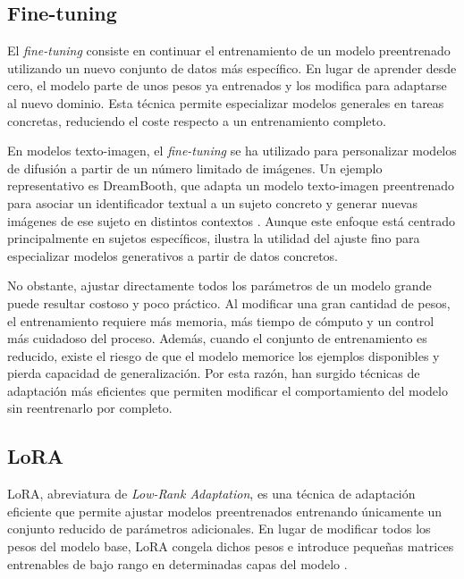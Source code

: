 \documentclass[a4paper,11pt,titlepage]{scrbook}
\begin{document}
\subsection{Fine-tuning}

El \textit{fine-tuning} consiste en continuar el entrenamiento de un modelo preentrenado utilizando un nuevo conjunto de datos más específico. En lugar de aprender desde cero, el modelo parte de unos pesos ya entrenados y los modifica para adaptarse al nuevo dominio. Esta técnica permite especializar modelos generales en tareas concretas, reduciendo el coste respecto a un entrenamiento completo.

\medskip

En modelos texto-imagen, el \textit{fine-tuning} se ha utilizado para personalizar modelos de difusión a partir de un número limitado de imágenes. Un ejemplo representativo es DreamBooth, que adapta un modelo texto-imagen preentrenado para asociar un identificador textual a un sujeto concreto y generar nuevas imágenes de ese sujeto en distintos contextos \cite{ruiz2023dreambooth}. Aunque este enfoque está centrado principalmente en sujetos específicos, ilustra la utilidad del ajuste fino para especializar modelos generativos a partir de datos concretos.

\medskip

No obstante, ajustar directamente todos los parámetros de un modelo grande puede resultar costoso y poco práctico. Al modificar una gran cantidad de pesos, el entrenamiento requiere más memoria, más tiempo de cómputo y un control más cuidadoso del proceso. Además, cuando el conjunto de entrenamiento es reducido, existe el riesgo de que el modelo memorice los ejemplos disponibles y pierda capacidad de generalización. Por esta razón, han surgido técnicas de adaptación más eficientes que permiten modificar el comportamiento del modelo sin reentrenarlo por completo.

\subsection{LoRA}

LoRA, abreviatura de \textit{Low-Rank Adaptation}, es una técnica de adaptación eficiente que permite ajustar modelos preentrenados entrenando únicamente un conjunto reducido de parámetros adicionales. En lugar de modificar todos los pesos del modelo base, LoRA congela dichos pesos e introduce pequeñas matrices entrenables de bajo rango en determinadas capas del modelo \cite{hu2022lora}.
\end{document}
